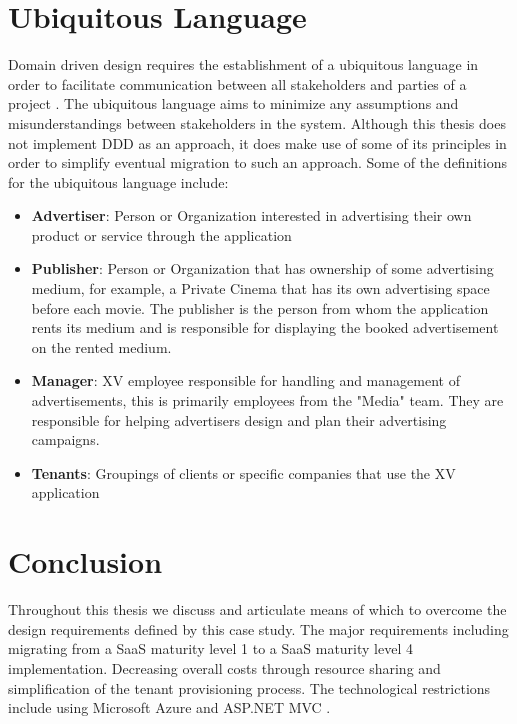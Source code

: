 \section{Ubiquitous Language}
Domain driven design requires the establishment of a ubiquitous language in order to facilitate communication between all stakeholders and parties of a project \cite{Evans2003}. The ubiquitous language aims to minimize any assumptions and misunderstandings between stakeholders in the system.  Although this thesis does not implement DDD as an approach, it does make use of some of its principles in order to simplify eventual migration to such an approach. Some of the definitions for the ubiquitous language include: 
\begin{itemize}
\item \textbf{Advertiser}: Person or Organization interested in advertising their own product or service through the application
\item \textbf{Publisher}: Person or Organization that has ownership of some advertising medium, for example, a Private Cinema that has its own advertising space before each movie. The publisher is the person from whom the application rents its medium and is responsible for displaying the booked advertisement on the rented medium. 
\item \textbf{Manager}: XV employee responsible for handling and management of advertisements, this is primarily employees from the "Media" team. They are responsible for helping advertisers design and plan their advertising campaigns.
\item \textbf{Tenants}: Groupings of clients or specific companies that use the XV application
\end{itemize}	


\section{Conclusion}

Throughout this thesis we discuss and articulate means of which to overcome the design requirements defined by this case study. The major requirements including migrating from a SaaS maturity level 1 to a SaaS maturity level 4 implementation. Decreasing overall costs through resource sharing and simplification of the tenant provisioning process. The technological restrictions include using Microsoft Azure and ASP.NET MVC .